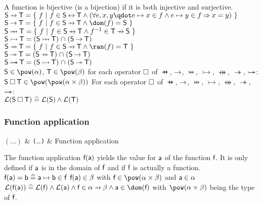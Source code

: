 \begin{samepage}
\begin{rodinrefentry}
  A function is bijective (is a bijection) if it is both injective and surjective.
  \rrdef
  $\exprs \pfun \exprt = \{~ f ~|~ f\in \exprs\rel \exprt \land (\forall e,x,y \qdot e\mapsto x\in f \land e\mapsto y\in f \limp x=y) ~\}$\\
  $\exprs \tfun \exprt = \{~ f ~|~ f\in \exprs\pfun \exprt \land \dom(f) = \exprs ~\}$\\
  $\exprs \pinj \exprt = \{~ f ~|~ f\in \exprs\pfun \exprt \land f^{-1} \in  \exprt\pfun \exprs ~\}$\\
  $\exprs \tinj \exprt = (\exprs\pinj \exprt) \binter (\exprs\tfun \exprt)$\\
  $\exprs \psur \exprt = \{~ f ~|~ f\in \exprs\pfun \exprt \land \ran(f) = \exprt ~\}$\\
  $\exprs \tsur \exprt = (\exprs\psur \exprt) \binter (\exprs\tfun \exprt)$\\
  $\textsf{S} \mathbin{ \rightarrowtail \mkern-18mu\twoheadrightarrow} \textsf{T} = (\textsf{S}\mathbin\rightarrowtail \textsf{T}) \mathbin{\mkern1mu\cap\mkern1mu} (\textsf{S}\mathbin\twoheadrightarrow \textsf{T})$\\
  \rrtypes
    $\exprs\in\pow(\alpha)$, $\exprt\in\pow(\beta)$ for each operator $\mathbin{\Box}$ of $\pfun$, $\mathbin\rightarrow$, $\pinj$, $\tinj$, $\psur$, $\tsur$, $\mathbin{ \rightarrowtail \mkern-18mu\twoheadrightarrow}$:\\
  $\exprs \opelipse \exprt \in \pow(\pow(\alpha\cprod\beta))$
  \rrwd
  For each operator $\mathbin{\Box}$ of $\pfun$, $\mathbin\rightarrow$, $\pinj$, $\tinj$, $\psur$, $\tsur$, $\mathbin{ \rightarrowtail \mkern-18mu\twoheadrightarrow}$:\\
  $\mathcal{L}(\textsf{S}\mathbin{\Box} \textsf{T}) \mathrel{\widehat=} \mathcal{L}(\textsf{S}) \land \mathcal{L}(\textsf{T})$
\end{rodinrefentry}
\end{samepage}

\begin{samepage}
\subsubsection{Function application}
\label{function_application}
\begin{rrnames}
  $(\ldots)$  & \texttt{(}\ldots\texttt{)}  & Function application
\end{rrnames}
\begin{rodinrefentry}
  \rrdesc
    The function application $\textsf{f}(\textsf{a})$ yields the value for $\textsf{a}$ of the function $\textsf{f}$.
    It is only defined if $\textsf{a}$ is in the domain of $\textsf{f}$ and if $\textsf{f}$ is actually a function.
  \rrdef
    $\textsf{f}(\textsf{a}) = \textsf{b} \mathrel{\widehat=} \textsf{a} \mapsto \textsf{b}\in \textsf{f}$
  \rrtypes
    $\textsf{f}(\textsf{a})\in\beta$ with $\exprlf\in\pow(\alpha\cprod\beta)$ and $\textsf{a}\in\alpha$
  \rrwd
    $\wdl(\exprlf(\exprla))\defi\wdl(\exprlf)\land\wdl(\exprla)\land\exprlf\in\alpha\pfun\beta \land \exprla\in\dom(\exprlf)$
    with $\pow(\alpha\cprod\beta)$ being the type of $\textsf{f}$.
\end{rodinrefentry}
\end{samepage}

